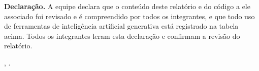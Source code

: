 \vspace{0.4cm}

\noindent\textbf{Declaração.} A equipe declara que o conteúdo deste
relatório e do código a ele associado foi revisado e é compreendido por
todos os integrantes, e que todo uso de ferramentas de inteligência
artificial generativa está registrado na tabela acima. Todos os
integrantes leram esta declaração e confirmam a revisão do relatório.

\vspace{0.4cm}

\imprimirTabelaIntegrantes

\vspace{0.4cm}

\noindent\localEntrega, \dataEntrega.
